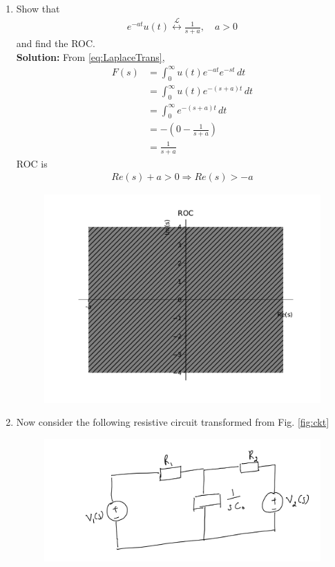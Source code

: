 \documentclass[journal,12pt,twocolumn]{IEEEtran}
\newcommand{\solution}{\noindent \textbf{Solution: }}
\providecommand{\brak}[1]{\ensuremath{\left(#1\right)}}
\providecommand{\system}[1]{\overset{\mathcal{#1}}{ \longleftrightarrow}}
\numberwithin{equation}{section}
\renewcommand\thesection{\arabic{section}}
\begin{document}
\begin{enumerate}[label=\arabic*.,ref=\thesection.\theenumi]
\begin{figure}[!ht]
			\caption{}
			\label{fig:roc1}
\end{figure}
	\item Show that 
		\begin{align}
			e^{-at}u(t) \system{L} \frac{1}{s+a}, \quad a > 0
		\end{align}
		and find the ROC.\\
		\solution From \ref{eq:LaplaceTrans},
		\begin{align}
		F(s)&=\int_{0}^{\infty} u(t)e^{-at}e^{-st} \,dt\\
		&=\int_{0}^{\infty} u(t)e^{-\brak{s+a}t} \,dt\\
		&=\int_{0}^{\infty} e^{-\brak{s+a}t} \,dt\\
		&=-\brak{0-\frac{1}{s+a}}\\
		&=\frac{1}{s+a}
		\end{align}
		ROC is
		\begin{align}
		Re(s)+a>0 \Rightarrow  Re(s)>-a
		\end{align}
		\begin{figure}[!ht]
			\centering
			\includegraphics[width=\columnwidth]{figs/2.5}
			\caption{}
			\label{fig:roc2}
\end{figure}
	\item Now consider the following resistive circuit transformed from 
			Fig. \ref{fig:ckt}
		\begin{figure}[!ht]
			\centering
			\includegraphics[width=\columnwidth]{figs/lap-ckt.jpg}

\end{figure}
\end{enumerate}
\end{document}

